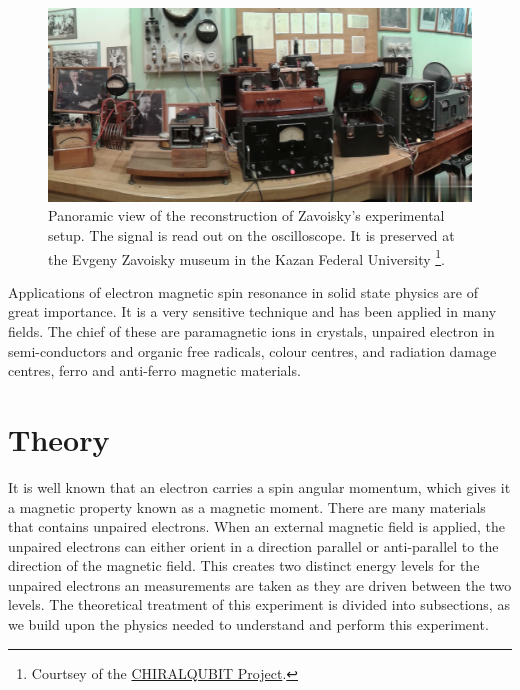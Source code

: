 \documentclass[%
 reprint,
nofootinbib,
 amsmath,amssymb,
 aps,
floatfix,
]{revtex4-2}
\begin{document}
    \begin{figure}
        \centering
        \includegraphics[scale = 0.18]{Figures/qloFRlMIUU-compress.jpg}
        \caption{Panoramic view of the reconstruction of Zavoisky's experimental setup. The signal is read out on the oscilloscope. It is preserved at the  Evgeny Zavoisky museum in the Kazan Federal University \footnote{Courtsey of the \href{http://chiralqubit.eu/a-visit-to-the-Zavoisky-museum}{CHIRALQUBIT Project}.}.}
        \label{fig:zavoisky}
    \end{figure}
    \par
    Applications of electron magnetic spin resonance in solid state physics are of great importance. It is a very sensitive technique and has been applied in many fields. The chief of these are paramagnetic ions in crystals, unpaired electron in semi-conductors and organic free radicals, colour centres, and radiation damage centres, ferro and anti-ferro magnetic materials.


\section{Theory}
    It is well known that an electron carries a spin angular momentum, which gives it a magnetic property known as a magnetic moment. There are many materials that contains unpaired electrons. When an external magnetic field is applied, the unpaired electrons can either orient in a direction parallel or anti-parallel to the direction of the magnetic field. This creates two distinct energy levels for the unpaired electrons an measurements are taken as they are driven between the two levels. The theoretical treatment of this experiment is divided into subsections, as we build upon the physics needed to understand and perform this experiment.
\end{document}
